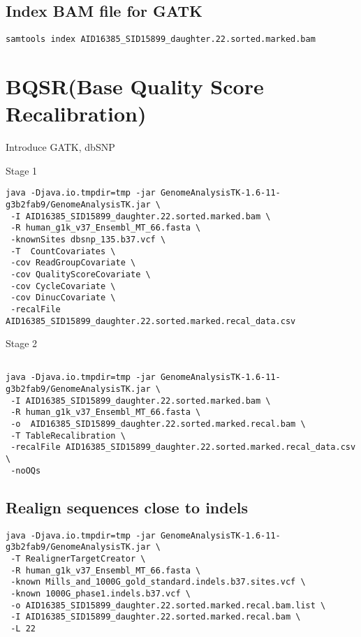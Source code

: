 \documentclass{article}
\begin{document}
\subsection{Index BAM file for GATK}
\begin{verbatim}
samtools index AID16385_SID15899_daughter.22.sorted.marked.bam
\end{verbatim}


\section{BQSR(Base Quality Score Recalibration)}

Introduce GATK, dbSNP

Stage 1
\begin{verbatim}
java -Djava.io.tmpdir=tmp -jar GenomeAnalysisTK-1.6-11-g3b2fab9/GenomeAnalysisTK.jar \
 -I AID16385_SID15899_daughter.22.sorted.marked.bam \
 -R human_g1k_v37_Ensembl_MT_66.fasta \
 -knownSites dbsnp_135.b37.vcf \
 -T  CountCovariates \
 -cov ReadGroupCovariate \
 -cov QualityScoreCovariate \
 -cov CycleCovariate \
 -cov DinucCovariate \
 -recalFile  AID16385_SID15899_daughter.22.sorted.marked.recal_data.csv 
\end{verbatim}
Stage 2
\begin{verbatim}
 
java -Djava.io.tmpdir=tmp -jar GenomeAnalysisTK-1.6-11-g3b2fab9/GenomeAnalysisTK.jar \
 -I AID16385_SID15899_daughter.22.sorted.marked.bam \
 -R human_g1k_v37_Ensembl_MT_66.fasta \
 -o  AID16385_SID15899_daughter.22.sorted.marked.recal.bam \
 -T TableRecalibration \
 -recalFile AID16385_SID15899_daughter.22.sorted.marked.recal_data.csv \
 -noOQs
 \end{verbatim}
 

\subsection{Realign sequences close to indels}
\begin{verbatim}
java -Djava.io.tmpdir=tmp -jar GenomeAnalysisTK-1.6-11-g3b2fab9/GenomeAnalysisTK.jar \
 -T RealignerTargetCreator \
 -R human_g1k_v37_Ensembl_MT_66.fasta \
 -known Mills_and_1000G_gold_standard.indels.b37.sites.vcf \
 -known 1000G_phase1.indels.b37.vcf \
 -o AID16385_SID15899_daughter.22.sorted.marked.recal.bam.list \
 -I AID16385_SID15899_daughter.22.sorted.marked.recal.bam \
 -L 22
 \end{verbatim}
\end{document}
